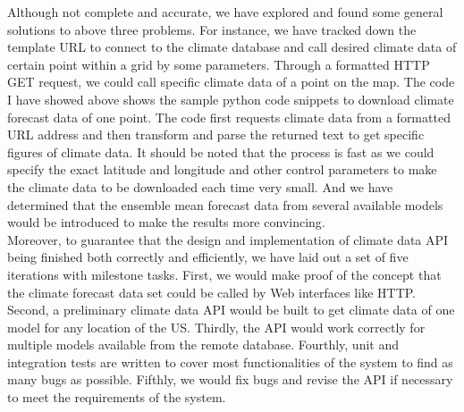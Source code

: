\documentclass[onecolumn, draftclsnofoot,10pt, compsoc]{article}
\begin{document}
		Although not complete and accurate, we have explored and found some general solutions to above three problems. For instance, we have tracked down the template URL to connect to the climate database and call desired climate data of certain point within a grid by some parameters. Through a formatted HTTP GET request, we could call specific climate data of a point on the map. The code I have showed above shows the sample python code snippets to download climate forecast data of one point. The code first requests climate data from a formatted URL address and then transform and parse the returned text to get specific figures of climate data. It should be noted that the process is fast as we could specify the exact latitude and longitude and other control parameters to make the climate data to be downloaded each time very small. And we have determined that the ensemble mean forecast data from several available models would be introduced to make the results more convincing. \\
		Moreover, to guarantee that the design and implementation of climate data API being finished both correctly and efficiently, we have laid out a set of five iterations with milestone tasks. First, we would make proof of the concept that the climate forecast data set could be called by Web interfaces like HTTP. Second, a preliminary climate data API would be built to get climate data of one model for any location of the US. Thirdly, the API would work correctly for multiple models available from the remote database. Fourthly, unit and integration tests are written to cover most functionalities of the system to find as many bugs as possible. Fifthly, we would fix bugs and revise the API if necessary to meet the requirements of the system.\\
\end{document}
